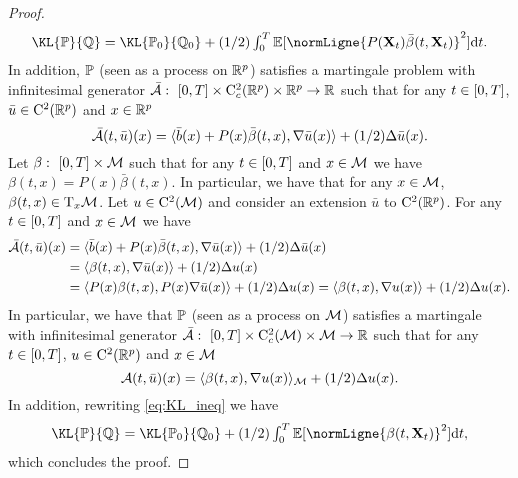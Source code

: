 \begin{proof}
      \begin{equation}
        \label{eq:KL_ineq}
      \textstyle{\KL{\Pbb}{\Qbb} = \KL{\Pbb_0}{\Qbb_0} + (1/2) \int_0^T \expeLigne{\normLigne{P(\bfX_t) \bar{\beta}(t, \bfX_t)}^2} \rmd t  .}
    \end{equation}
    In addition, $\mathbb{P}$ (seen as a process on $\mathbb{R}^p$) satisfies a martingale
    problem with infinitesimal generator
    $\bar{\mathcal{A}}: \ \left[0,T\right] \times \mathrm{C}^2_c(\mathbb{R}^p) \times \mathbb{R}^p \to \mathbb{R}$ such that
    for any $t \in \left[0,T\right]$, $\bar{u} \in \mathrm{C}^2(\mathbb{R}^p)$ and $x \in \mathbb{R}^p$
    \begin{equation}
      \bar{\mathcal{A}}(t,\bar{u})(x) = \langle \bar{b}(x) + P(x)\bar{\beta}(t,x), \nabla \bar{u}(x) \rangle + (1/2) \Delta \bar{u}(x)  . 
    \end{equation}
    Let $\beta: \ \ccint{0,T} \times \M$ such that for any $t \in \left[0,T\right]$
    and $x \in \mathcal M$ we have $\beta(t,x) = P(x) \bar{\beta}(t,x)$. In particular,
    we have that for any $x \in \mathcal M$, $\beta(t,x) \in \mathrm{T}_x\mathcal M$. Let
    $u \in \mathrm{C}^2(\mathcal M)$  and consider an extension $\bar{u}$
    to $\mathrm{C}^2(\mathbb{R}^p)$. For any $t \in \left[0,T\right]$ and $x \in \mathcal M$ we have
    \begin{align}
      \bar{\mathcal{A}}(t,\bar{u})(x) &= \langle \bar{b}(x) + P(x)\bar{\beta}(t,x), \nabla \bar{u}(x) \rangle + (1/2) \Delta \bar{u}(x) \\
                               &= \langle  \beta(t,x), \nabla \bar{u}(x) \rangle + (1/2) \Delta u(x) \\
                               &= \langle P(x) \beta(t,x), P(x) \nabla \bar{u}(x) \rangle + (1/2) \Delta u(x) = \langle \beta(t,x), \nabla u(x) \rangle + (1/2) \Delta u(x)  . 
    \end{align}
    In particular, we have that $\mathbb{P}$ (seen as a process on $\mathcal M$) satisfies a
    martingale with infinitesimal generator
    $\generatorb: \ \ccint{0,T} \times \rmc^2_c(\M) \times \M \to \rset$ such that
    for any $t \in \left[0,T\right]$, $u \in \mathrm{C}^2(\mathbb{R}^p)$ and $x \in \mathcal M$
    \begin{equation}
      \mathcal{A}(t,\bar{u})(x) = \langle \beta(t,x), \nabla u(x) \rangle_\mathcal M + (1/2) \Delta u(x)  . 
    \end{equation}
    In addition, rewriting \eqref{eq:KL_ineq} we have
      \begin{equation}
        \label{eq:KL_ineq}
      \textstyle{\KL{\Pbb}{\Qbb} = \KL{\Pbb_0}{\Qbb_0} + (1/2) \int_0^T \expeLigne{\normLigne{\beta(t, \bfX_t)}^2} \rmd t  ,}
    \end{equation}
    which concludes the proof.
  \end{proof}
  
